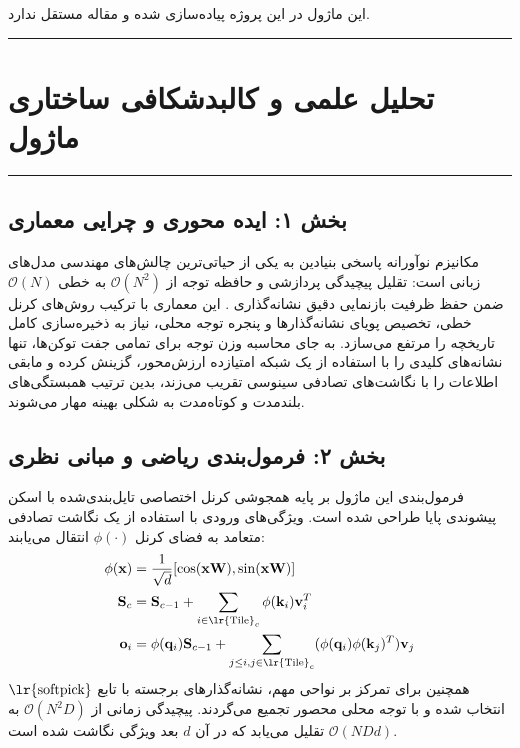 \clearpage
{}
\vspace*{0.2cm}

این ماژول در این پروژه پیاده‌سازی شده و مقاله مستقل ندارد.
\noindent\rule{\textwidth}{1.2pt}
\vspace*{0.1cm}
\section{تحلیل علمی و کالبدشکافی ساختاری ماژول }
\label{sec:mod_leka_v3}
\vspace*{-0.2cm}
\noindent\rule{\textwidth}{0.5pt}
\vspace*{0.3cm}

\subsection*{بخش ۱: ایده محوری و چرایی معماری }
مکانیزم نوآورانه   پاسخی بنیادین به یکی از حیاتی‌ترین چالش‌های مهندسی مدل‌های زبانی است: تقلیل پیچیدگی پردازشی و حافظه توجه از $\mathcal{O}(N^2)$ به خطی $\mathcal{O}(N)$ ضمن حفظ ظرفیت بازنمایی دقیق نشانه‌گذاری . این معماری با ترکیب روش‌های کرنل خطی، تخصیص پویای نشانه‌گذارها  و پنجره توجه محلی، نیاز به ذخیره‌سازی کامل تاریخچه را مرتفع می‌سازد. به جای محاسبه وزن توجه برای تمامی جفت توکن‌ها،  تنها نشانه‌های کلیدی را با استفاده از یک شبکه‌ امتیازده ارزش‌محور، گزینش کرده و مابقی اطلاعات را با نگاشت‌های تصادفی سینوسی تقریب می‌زند، بدین ترتیب همبستگی‌های بلند‌مدت و کوتاه‌مدت به شکلی بهینه مهار می‌شوند.

\subsection*{بخش ۲: فرمول‌بندی ریاضی و مبانی نظری }
فرمول‌بندی این ماژول بر پایه همجوشی کرنل اختصاصی تایل‌بندی‌شده با اسکن پیشوندی پایا طراحی شده است. ویژگی‌های ورودی با استفاده از یک نگاشت تصادفی متعامد به فضای کرنل $\phi(\cdot)$ انتقال می‌یابند:
\begin{align}
\phi(\mathbf{x}) &= \frac{1}{\sqrt{d}} [\cos(\mathbf{x}\mathbf{W}), \sin(\mathbf{x}\mathbf{W})] \\
\mathbf{S}_c &= \mathbf{S}_{c-1} + \sum_{i \in \text{\lr{Tile}}_c} \phi(\mathbf{k}_i) \mathbf{v}_i^T \\
\mathbf{o}_i &= \phi(\mathbf{q}_i) \mathbf{S}_{c-1} + \sum_{j \le i, j \in \text{\lr{Tile}}_c} (\phi(\mathbf{q}_i) \phi(\mathbf{k}_j)^T) \mathbf{v}_j
\end{align}
همچنین برای تمرکز بر نواحی مهم، نشانه‌گذارهای برجسته با تابع $\text{\lr{softpick}}$ انتخاب شده و با توجه محلی محصور  تجمیع می‌گردند. پیچیدگی زمانی از $\mathcal{O}(N^2 D)$ به $\mathcal{O}(N D d)$ تقلیل می‌یابد که در آن $d$ بعد ویژگی نگاشت شده است.

